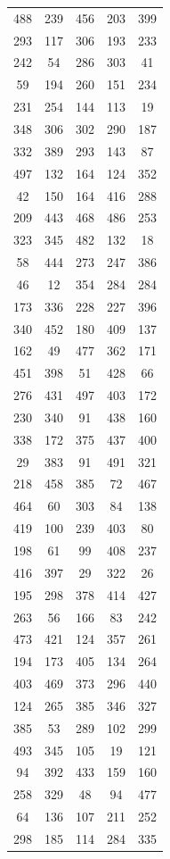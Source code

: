 \documentclass[a4paper,12pt]{article}
\begin{document}
\begin{longtable}{|c|c|c|c|c|}
488 & 239 & 456 & 203 & 399 \\
293 & 117 & 306 & 193 & 233 \\
242 & 54 & 286 & 303 & 41 \\
59 & 194 & 260 & 151 & 234 \\
231 & 254 & 144 & 113 & 19 \\
348 & 306 & 302 & 290 & 187 \\
332 & 389 & 293 & 143 & 87 \\
497 & 132 & 164 & 124 & 352 \\
42 & 150 & 164 & 416 & 288 \\
209 & 443 & 468 & 486 & 253 \\
323 & 345 & 482 & 132 & 18 \\
58 & 444 & 273 & 247 & 386 \\
46 & 12 & 354 & 284 & 284 \\
173 & 336 & 228 & 227 & 396 \\
340 & 452 & 180 & 409 & 137 \\
162 & 49 & 477 & 362 & 171 \\
451 & 398 & 51 & 428 & 66 \\
276 & 431 & 497 & 403 & 172 \\
230 & 340 & 91 & 438 & 160 \\
338 & 172 & 375 & 437 & 400 \\
29 & 383 & 91 & 491 & 321 \\
218 & 458 & 385 & 72 & 467 \\
464 & 60 & 303 & 84 & 138 \\
419 & 100 & 239 & 403 & 80 \\
198 & 61 & 99 & 408 & 237 \\
416 & 397 & 29 & 322 & 26 \\
195 & 298 & 378 & 414 & 427 \\
263 & 56 & 166 & 83 & 242 \\
473 & 421 & 124 & 357 & 261 \\
194 & 173 & 405 & 134 & 264 \\
403 & 469 & 373 & 296 & 440 \\
124 & 265 & 385 & 346 & 327 \\
385 & 53 & 289 & 102 & 299 \\
493 & 345 & 105 & 19 & 121 \\
94 & 392 & 433 & 159 & 160 \\
258 & 329 & 48 & 94 & 477 \\
64 & 136 & 107 & 211 & 252 \\
298 & 185 & 114 & 284 & 335 \\

\end{longtable}
\end{document}
